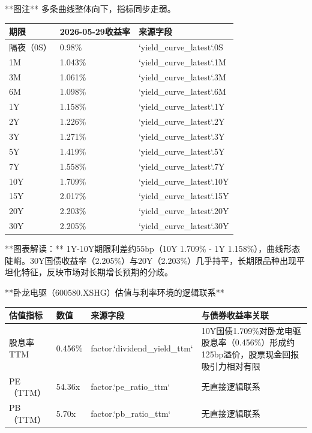 \documentclass[12pt,a4paper]{article}
\begin{document}
**图注** 多条曲线整体向下，指标同步走弱。

\begin{table}[htbp]
\centering
\begin{tabular}{lll}
\toprule
期限 & 2026-05-29收益率 & 来源字段 \\
\midrule
隔夜（0S） & 0.98\% & `yield\_curve\_latest`.0S \\
1M & 1.043\% & `yield\_curve\_latest`.1M \\
3M & 1.061\% & `yield\_curve\_latest`.3M \\
6M & 1.098\% & `yield\_curve\_latest`.6M \\
1Y & 1.158\% & `yield\_curve\_latest`.1Y \\
2Y & 1.226\% & `yield\_curve\_latest`.2Y \\
3Y & 1.271\% & `yield\_curve\_latest`.3Y \\
5Y & 1.419\% & `yield\_curve\_latest`.5Y \\
7Y & 1.558\% & `yield\_curve\_latest`.7Y \\
10Y & 1.709\% & `yield\_curve\_latest`.10Y \\
15Y & 2.017\% & `yield\_curve\_latest`.15Y \\
20Y & 2.203\% & `yield\_curve\_latest`.20Y \\
30Y & 2.205\% & `yield\_curve\_latest`.30Y \\
\bottomrule
\end{tabular}
\end{table}


**图表解读：** 1Y-10Y期限利差约55bp（10Y 1.709\% - 1Y 1.158\%），曲线形态陡峭。30Y国债收益率（2.205\%）与20Y（2.203\%）几乎持平，长期限品种出现平坦化特征，反映市场对长期增长预期的分歧。

**卧龙电驱（600580.XSHG）估值与利率环境的逻辑联系**

\begin{table}[htbp]
\centering
\begin{tabular}{llll}
\toprule
估值指标 & 数值 & 来源字段 & 与债券收益率关联 \\
\midrule
股息率TTM & 0.456\% & factor.`dividend\_yield\_ttm` & 10Y国债1.709\%对卧龙电驱股息率（0.456\%）形成约125bp溢价，股票现金回报吸引力相对有限 \\
PE（TTM） & 54.36x & factor.`pe\_ratio\_ttm` & 无直接逻辑联系 \\
PB（TTM） & 5.70x & factor.`pb\_ratio\_ttm` & 无直接逻辑联系 \\
\bottomrule
\end{tabular}
\end{table}
\end{document}
